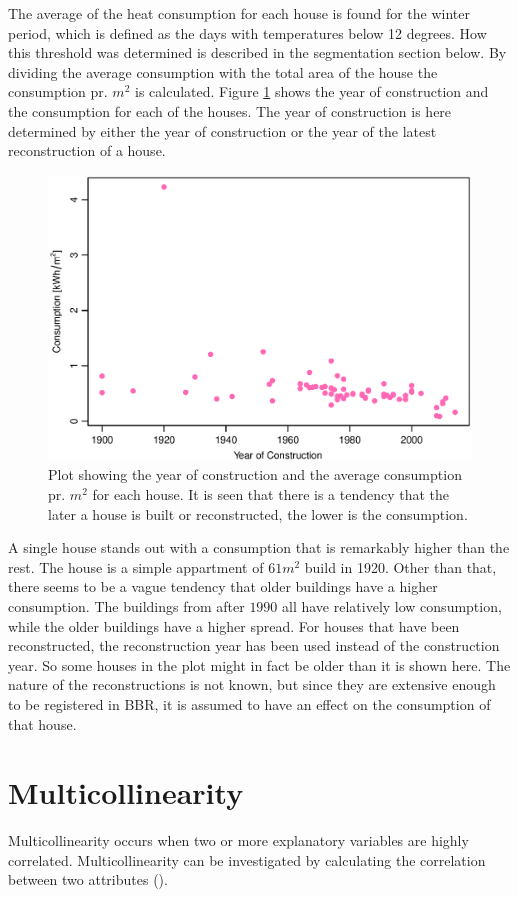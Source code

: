 \noindent The average of the heat consumption for each house is found for the winter period, which is defined as the days with temperatures below 12 degrees. How this threshold was determined is described in the segmentation section below. By dividing the average consumption with the total area of the house the consumption pr. $m^2$ is calculated. Figure \ref{fig: byggeaar} shows the year of construction and the consumption for each of the houses. The year of construction is here determined by either the year of construction or the year of the latest reconstruction of a house. 
\begin{figure}
    \centering
    \includegraphics[width=.75\textwidth]{../../../figures/byggeaar.eps}
    \caption{Plot showing the year of construction and the average consumption pr. $m^2$ for each house. It is seen that there is a tendency that the later a house is built or reconstructed, the lower is the consumption.}
    \label{fig: byggeaar}
\end{figure}
\noindent A single house stands out with a consumption that is remarkably higher than the rest. The house is a simple appartment of $61 m^2$ build in 1920. Other than that, there seems to be a vague tendency that older buildings have a higher consumption. The buildings from after $1990$ all have relatively low consumption, while the older buildings have a higher spread. For houses that have been reconstructed, the reconstruction year has been used instead of the construction year. So some houses in the plot might in fact be older than it is shown here. The nature of the reconstructions is not known, but since they are extensive enough to be registered in BBR, it is assumed to have an effect on the consumption of that house.

\section{Multicollinearity}
Multicollinearity occurs when two or more explanatory variables are highly correlated. Multicollinearity can be investigated by calculating the correlation between two attributes (\cite{Multicollinearity}).

